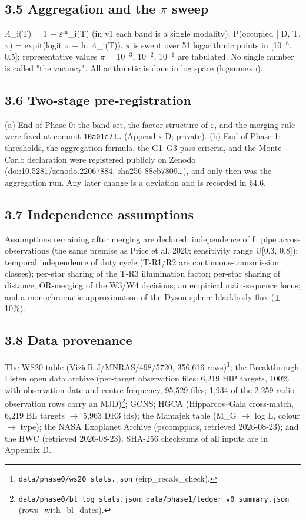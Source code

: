 \documentclass[11pt]{article}
\begin{document}
\subsection*{3.5 Aggregation and the \(\pi\) sweep}
\noindent \(\Lambda\)\_i(T) = 1 \(-\) \(\varepsilon\)\(^{\mathrm{m}}\)\_i(T) (in v1 each band is a single modality). P(occupied | D, T, \(\pi\)) = expit(logit \(\pi\) + ln \(\Lambda\)\_i(T)). \(\pi\) is swept over 51 logarithmic points in [10\(^{-6}\), 0.5]; representative values \(\pi\) = 10\(^{-3}\), 10\(^{-2}\), 10\(^{-1}\) are tabulated. No single number is called "the vacancy". All arithmetic is done in log space (logsumexp).\par\smallskip

\subsection*{3.6 Two-stage pre-registration}
\noindent (a) End of Phase 0: the band set, the factor structure of \(\varepsilon\), and the merging rule were fixed at commit \texttt{10a01e71…} (Appendix D; private). (b) End of Phase 1: thresholds, the aggregation formula, the G1--G3 pass criteria, and the Monte-Carlo declaration were registered publicly on Zenodo (\url{doi:10.5281/zenodo.22067884}, sha256 88eb7809\ldots{}), and only then was the aggregation run. Any later change is a deviation and is recorded in \S{}4.6.\par\smallskip

\subsection*{3.7 Independence assumptions}
\noindent Assumptions remaining after merging are declared: independence of f\_pipe across observations (the same premise as Price et al. 2020; sensitivity range U[0.3, 0.8]); temporal independence of duty cycle (T-R1/R2 are continuous-transmission classes); per-star sharing of the T-R3 illumination factor; per-star sharing of distance; OR-merging of the W3/W4 decisions; an empirical main-sequence locus; and a monochromatic approximation of the Dyson-sphere blackbody flux (\(\pm\)10\%).\par\smallskip

\subsection*{3.8 Data provenance}
\noindent The WS20 table (VizieR J/MNRAS/498/5720, 356,616 rows)\footnote{\texttt{data/phase0/ws20\_stats.json} (eirp\_recalc\_check).}; the Breakthrough Listen open data archive (per-target observation files: 6,219 HIP targets, 100\% with observation date and centre frequency, 95,529 files; 1,934 of the 2,259 radio observation rows carry an MJD)\footnote{\texttt{data/phase0/bl\_log\_stats.json}; \texttt{data/phase1/ledger\_v0\_summary.json} (rows\_with\_bl\_dates).}; GCNS; HGCA (Hipparcos--Gaia cross-match, 6,219 BL targets \(\rightarrow\) 5,963 DR3 ids); the Mamajek table (M\_G \(\rightarrow\) log L, colour \(\rightarrow\) type); the NASA Exoplanet Archive (pscomppars, retrieved 2026-08-23); and the HWC (retrieved 2026-08-23). SHA-256 checksums of all inputs are in Appendix D.\par\smallskip
\end{document}
